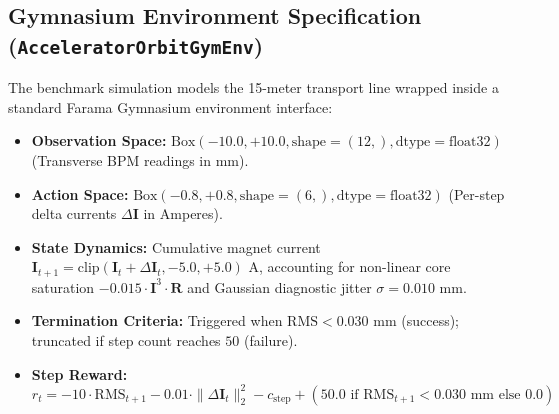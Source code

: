 \documentclass[11pt,a4paper]{article}
\begin{document}
\subsection{Gymnasium Environment Specification (\texttt{AcceleratorOrbitGymEnv})}
The benchmark simulation models the 15-meter transport line wrapped inside a standard Farama Gymnasium environment interface:
\begin{itemize}
    \item \textbf{Observation Space:} $\text{Box}(-10.0, +10.0, \text{shape}=(12,), \text{dtype}=\text{float32})$ (Transverse BPM readings in mm).
    \item \textbf{Action Space:} $\text{Box}(-0.8, +0.8, \text{shape}=(6,), \text{dtype}=\text{float32})$ (Per-step delta currents $\Delta \mathbf{I}$ in Amperes).
    \item \textbf{State Dynamics:} Cumulative magnet current $\mathbf{I}_{t+1} = \text{clip}(\mathbf{I}_t + \Delta \mathbf{I}_t, -5.0, +5.0)\text{ A}$, accounting for non-linear core saturation $-0.015 \cdot \mathbf{I}^3 \cdot \mathbf{R}$ and Gaussian diagnostic jitter $\sigma = 0.010\text{ mm}$.
    \item \textbf{Termination Criteria:} Triggered when $\text{RMS} < 0.030\text{ mm}$ (success); truncated if step count reaches $50$ (failure).
    \item \textbf{Step Reward:}
    \begin{equation}
        r_t = - 10 \cdot \text{RMS}_{t+1} - 0.01 \cdot \|\Delta \mathbf{I}_t\|_2^2 - c_{\text{step}} + (50.0 \text{ if } \text{RMS}_{t+1} < 0.030\text{ mm} \text{ else } 0.0)
    \end{equation}
\end{itemize}
\end{document}
